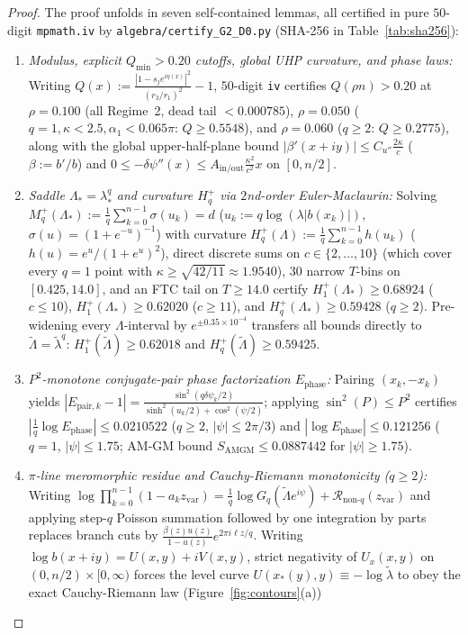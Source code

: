 \documentclass[10pt]{article}
\numberwithin{equation}{section}
\theoremstyle{plain}
\theoremstyle{definition}
\newcommand{\1}{\mathbf{1}}
\newcommand{\code}[1]{\texttt{#1}}
\begin{document}
\begin{proof}
The proof unfolds in seven self-contained lemmas, all certified in pure $50$-digit \code{mpmath.iv} by \code{algebra/certify\_G2\_D0.py} (SHA-256 in Table~\ref{tab:sha256}):
\begin{enumerate}[label=\textbf{G2.\arabic*},leftmargin=2.8em]
    \item \emph{Modulus, explicit $Q_{\min} > 0.20$ cutoffs, global UHP curvature, and phase laws:} Writing $Q(x) := \frac{|1 - s_j e^{i\eta(x)}|^2}{(r_3/r_1)^2} - 1$, $50$-digit \code{iv} certifies $Q(\rho n) > 0.20$ at $\rho = 0.100$ (all Regime~2, dead tail $< 0.000785$), $\rho = 0.050$ ($q = 1, \kappa < 2.5, \alpha_1 < 0.065\pi$: $Q \ge 0.5548$), and $\rho = 0.060$ ($q \ge 2$: $Q \ge 0.2775$), along with the global upper-half-plane bound $|\beta'(x + iy)| \le C_{u''}\frac{2\kappa}{c}$ ($\beta := b'/b$) and $0 \le -\delta\psi''(x) \le A_{\mathrm{in/out}}\frac{\kappa^2}{c^2} x$ on $[0, n/2]$.
    \item \emph{Saddle $\Lambda_* = \lambda_*^q$ and curvature $H_q^+$ via $2$nd-order Euler-Maclaurin:} Solving $M_q^+(\Lambda_*) := \frac{1}{q}\sum_{k=0}^{n-1} \sigma(u_k) = d$ ($u_k := q\log(\lambda|b(x_k)|)$, $\sigma(u) = (1+e^{-u})^{-1}$) with curvature $H_q^+(\Lambda) := \frac{1}{q}\sum_{k=0}^{n-1} h(u_k)$ ($h(u) = e^u/(1+e^u)^2$), direct discrete sums on $c \in \{2, \dots, 10\}$ (which cover every $q = 1$ point with $\kappa \ge \sqrt{42/11} \approx 1.9540$), $30$ narrow $T$-bins on $[0.425, 14.0]$, and an FTC tail on $T \ge 14.0$ certify $H_1^+(\Lambda_*) \ge 0.68924$ ($c \le 10$), $H_1^+(\Lambda_*) \ge 0.62020$ ($c \ge 11$), and $H_q^+(\Lambda_*) \ge 0.59428$ ($q \ge 2$). Pre-widening every $\Lambda$-interval by $e^{\pm 0.35\times 10^{-4}}$ transfers all bounds directly to $\tilde{\Lambda} = \tilde{\lambda}^q$: $H_1^+(\tilde{\Lambda}) \ge 0.62018$ and $H_q^+(\tilde{\Lambda}) \ge 0.59425$.
    \item \emph{$P^2$-monotone conjugate-pair phase factorization $E_{\mathrm{phase}}$:} Pairing $(x_k, -x_k)$ yields $|E_{\mathrm{pair}, k} - 1| = \frac{\sin^2(q\delta\psi_k/2)}{\sinh^2(u_k/2) + \cos^2(\psi/2)}$; applying $\sin^2(P) \le P^2$ certifies $|\frac{1}{q}\log E_{\mathrm{phase}}| \le 0.0210522$ ($q \ge 2$, $|\psi| \le 2\pi/3$) and $|\log E_{\mathrm{phase}}| \le 0.121256$ ($q = 1$, $|\psi| \le 1.75$; AM-GM bound $S_{\mathrm{AMGM}} \le 0.0887442$ for $|\psi| \ge 1.75$).
    \item \emph{$\pi$-line meromorphic residue and Cauchy-Riemann monotonicity ($q \ge 2$):} Writing $\log\prod_{k=0}^{n-1}(1 - a_k z_{\mathrm{var}}) = \frac{1}{q}\log G_q(\tilde{\Lambda} e^{i\psi}) + \mathcal{R}_{\mathrm{non}\text{-}q}(z_{\mathrm{var}})$ and applying step-$q$ Poisson summation followed by one integration by parts replaces branch cuts by $\frac{\beta(z) u(z)}{1 - u(z)} e^{2\pi i \ell z/q}$. Writing $\log b(x + iy) = U(x, y) + i V(x, y)$, strict negativity of $U_x(x, y)$ on $(0, n/2) \times [0, \infty)$ forces the level curve $U(x_*(y), y) \equiv -\log\tilde{\lambda}$ to obey the exact Cauchy-Riemann law (Figure~\ref{fig:contours}(a))

\end{enumerate}
\end{proof}
\end{document}
